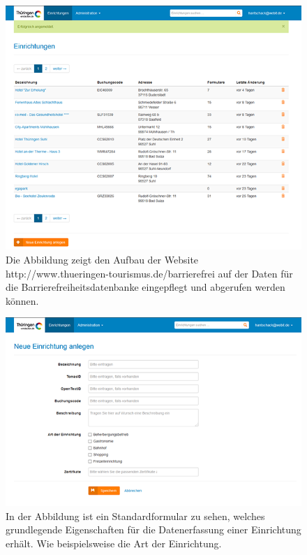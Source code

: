\begin{figure}[htb]
	\includegraphics[width=\textwidth]{Bilder/Barrierefreidatenbank}
	\caption{Die Abbildung zeigt den Aufbau der Website http://www.thueringen-tourismus.de/barrierefrei auf der Daten für die Barrierefreiheitsdatenbanke eingepflegt und abgerufen werden können.}
	\label{Barrierefreidatenbank}
\end{figure}

\begin{figure}[htb]
	\includegraphics[width=\textwidth]{Bilder/Datenerfassung}
	\caption{In der Abbildung ist ein Standardformular zu sehen, welches grundlegende Eigenschaften für die Datenerfassung einer Einrichtung erhält. Wie beispielsweise die Art der Einrichtung.}
	\label{Datenerfassung}
\end{figure}

